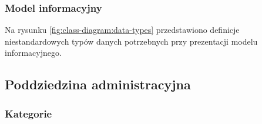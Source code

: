 \subsubsection{Model informacyjny}\label{subsubsec:database:domain:domainModel}
Na rysunku \ref{fig:class-diagram:data-types} przedstawiono definicje niestandardowych typów danych potrzebnych przy prezentacji modelu informacyjnego.


\subsection{Poddziedzina administracyjna}\label{subsec:database:gateway}

\subsubsection{Kategorie}\label{subsubsec:database:gateway:categories}

